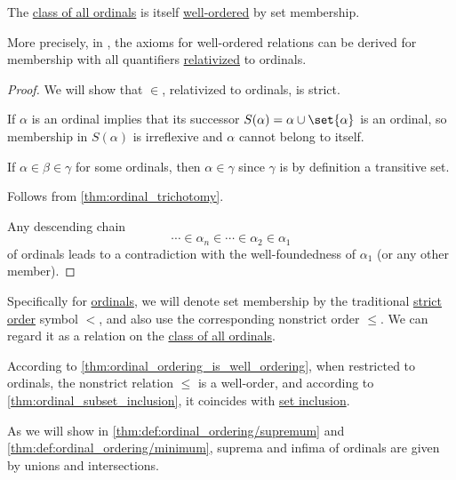 \begin{proposition}\label{thm:ordinal_ordering_is_well_ordering}
  The \hyperref[def:class_of_all_ordinals]{class of all ordinals} is itself \hyperref[def:well_ordered_set]{well-ordered} by set membership.

  More precisely, in \hyperref[def:zfc]{}, the axioms for well-ordered relations can be derived for membership with all quantifiers \hyperref[con:predicate_logic/relativization]{relativized} to ordinals.
\end{proposition}
\begin{proof}
  We will show that \( \in \), relativized to ordinals, is strict.

   If \( \alpha \) is an ordinal  implies that its successor \( S(\alpha) = \alpha \cup \set{ \alpha } \) is an ordinal, so membership in \( S(\alpha) \) is irreflexive and \( \alpha \) cannot belong to itself.

   If \( \alpha \in \beta \in \gamma \) for some ordinals, then \( \alpha \in \gamma \) since \( \gamma \) is by definition a transitive set.

   Follows from \cref{thm:ordinal_trichotomy}.

   Any descending chain
  \begin{equation*}
    \cdots \in \alpha_n \in \cdots \in \alpha_2 \in \alpha_1
  \end{equation*}
  of ordinals leads to a contradiction with the well-foundedness of \( \alpha_1 \) (or any other member).
\end{proof}

\begin{definition}\label{def:ordinal_ordering}
  Specifically for \hyperref[def:ordinal]{ordinals}, we will denote set membership by the traditional \hyperref[eq:def:peano_arithmetic_ordering/strict]{strict order} symbol \( {<} \), and also use the corresponding nonstrict order \( {\leq} \). We can regard it as a relation on the \hyperref[def:class_of_all_ordinals]{class of all ordinals}.
\end{definition}
\begin{comments}
  \item According to \cref{thm:ordinal_ordering_is_well_ordering}, when restricted to ordinals, the nonstrict relation \( {\leq} \) is a well-order, and according to \cref{thm:ordinal_subset_inclusion}, it coincides with \hyperref[def:inclusion_order]{set inclusion}.

  \item As we will show in \cref{thm:def:ordinal_ordering/supremum} and \cref{thm:def:ordinal_ordering/minimum}, suprema and infima of ordinals are given by unions and intersections.
\end{comments}

